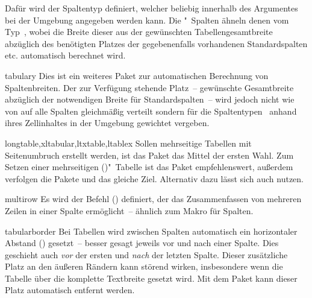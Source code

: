 \begin{packages}
  Dafür wird der Spaltentyp  definiert, welcher beliebig innerhalb
  des Argumentes  bei der Umgebung  
  angegeben werden kann. Die "~Spalten ähneln denen vom 
  Typ~, wobei die Breite dieser aus der gewünschten 
  Tabellengesamtbreite abzüglich des benötigten Platzes der gegebenenfalls 
  vorhandenen Standardspalten  etc. automatisch berechnet wird.
\item[tabulary]
  Dies ist ein weiteres Paket zur automatischen Berechnung von Spaltenbreiten. 
  Der zur Verfügung stehende Platz~-- gewünschte Gesamtbreite abzüglich der 
  notwendigen Breite für Standardspalten~-- wird jedoch nicht wie von 
   auf alle Spalten gleichmäßig verteilt sondern für die 
  Spaltentypen~ anhand ihres Zellinhaltes in der Umgebung 
  gewichtet vergeben.
\item[longtable,xltabular,ltxtable,ltablex]
  Sollen mehrseitige Tabellen mit Seitenumbruch erstellt werden, ist das Paket
   das Mittel der ersten Wahl. Zum Setzen einer mehrseitigen 
  ()"~Tabelle ist das Paket 
   empfehlenswert, außerdem verfolgen die Pakete 
   und  das gleiche Ziel. Alternativ dazu 
  lässt sich auch  nutzen.
\item[multirow]
  Es wird der Befehl () definiert, der das 
  Zusammenfassen von mehreren Zeilen in einer Spalte ermöglicht~-- ähnlich zum 
  Makro  für Spalten.
\item[tabularborder]
  Bei Tabellen wird zwischen Spalten automatisch ein horizontaler Abstand 
  () gesetzt~-- besser gesagt jeweils vor und nach einer 
  Spalte. Dies geschieht auch \emph{vor} der ersten und \emph{nach} der letzten 
  Spalte. Dieser zusätzliche Platz an den äußeren Rändern kann störend wirken, 
  insbesondere wenn die Tabelle über die komplette Textbreite gesetzt wird. Mit 
  dem Paket  kann dieser Platz automatisch entfernt 
  werden.
  

\end{packages}
